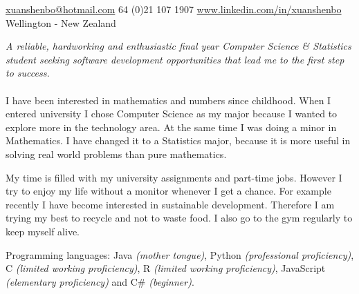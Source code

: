 \documentclass[10pt,a4paper]{article}
\begin{document}
\sloppy  %



\nobreakvspace{0.3em}  %

\noindent\href{mailto:xuanshenbo@hotmail.com}{xuanshenbo\mbox{}@\mbox{}hotmail.com}\sbull
\textsmaller{+}64 (0)21 107 1907\sbull
\href{http://www.linkedin.com/in/xuanshenbo}{www.linkedin.com/in/xuanshenbo}
\\
Wellington - New Zealand

\spacedhrule{0.9em}{-0.4em}  %


\vspace{-1.3em}  %
\begin{multicols}{2}  %
\noindent \emph{A reliable, hardworking and enthusiastic final year Computer Science \& Statistics student seeking software development opportunities that lead me to the first step to success.}
\\
\\

I have been interested in mathematics and numbers since childhood.
When I entered university I chose Computer Science as my major because I wanted to explore more in the technology area.
At the same time I was doing a minor in Mathematics.
I have changed it to a Statistics major, because it is more useful in solving real world problems than pure mathematics.

My time is filled with my university assignments and part-time jobs.
However I try to enjoy my life without a monitor whenever I get a chance.
For example recently I have become interested in sustainable development.
Therefore I am trying my best to recycle and not to waste food.
I also go to the gym regularly to keep myself alive.

\end{multicols}



\spacedhrule{0.5em}{-0.4em}



\inlineheadsection
  {Programming languages:}
  {Java \emph{(mother tongue)}, Python \emph{(professional proficiency)}, C \emph{(limited working proficiency)}, R \emph{(limited working proficiency)}, JavaScript \emph{(elementary proficiency)} and C\# \emph{(beginner)}.}
\end{document}
